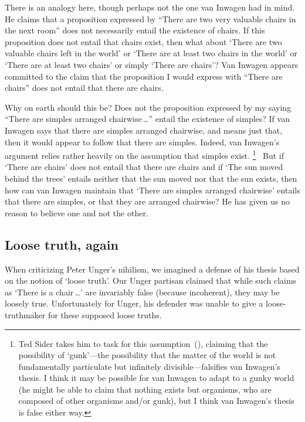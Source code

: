 \documentclass[11pt]{article}
\begin{document}
\begin{spacing}{1.5}
There is an analogy here, though perhaps not the one van Inwagen had in mind. He claims that a proposition expressed by ``There are two very valuable chairs in the next room'' does not necessarily entail the existence of chairs. If this proposition does not entail that chairs exist, then what about `There are two valuable chairs left in the world' or `There are at least two chairs in the world' or `There are at least two chairs' or simply `There are chairs'? Van Inwagen appears committed to the claim that the proposition I would express with ``There are chairs'' does not entail that there are chairs.

Why on earth should this be? Does not the proposition expressed by my saying ``There are simples arranged chairwise\,\ldots '' entail the existence of simples? If van Inwagen says that there are simples arranged chairwise, and means just that, then it would appear to follow that there are simples. Indeed, van Inwagen's argument relies rather heavily on the assumption that simples exist.%
%
\footnote{Ted Sider takes him to task for this assumption~(\citeyear{sider1993}), claiming that the possibility of `gunk'---the possibility that the matter of the world is not fundamentally particulate but infinitely divisible---falsifies van Inwagen's thesis. I think it may be possible for van Inwagen to adapt to a gunky world (he might be able to claim that nothing exists but organisms, who are composed of other organisms and/or gunk), but I think van Inwagen's thesis is false either way.}
%
\ But if `There are chairs' does not entail that there are chairs and if `The sun moved behind the trees' entails neither that the sun moved nor that the sun exists, then how can van Inwagen maintain that `There are simples arranged chairwise' entails that there are simples, or that they are arranged chairwise? He has given us no reason to believe one and not the other.

\subsection{Loose truth, again}
\label{loose-v}
When criticizing Peter Unger's nihilism, we imagined a defense of his thesis based on the notion of `loose truth'. Our Unger partisan claimed that while such claims as `There is a chair\,\ldots ' are invariably false (because incoherent), they may be loosely true. Unfortunately for Unger, his defender was unable to give a loose-truthmaker for these supposed loose truths.


\end{spacing}
\end{document}
